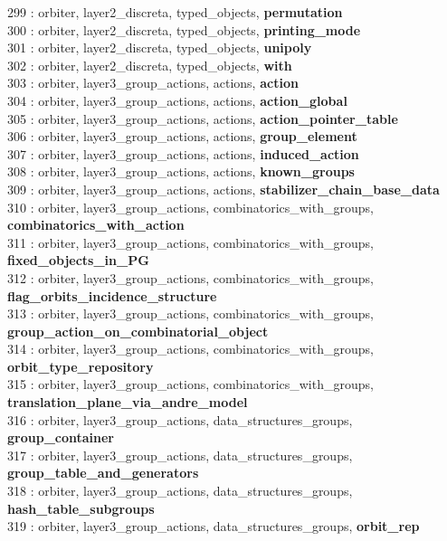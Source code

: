 299 : orbiter, layer2\_discreta, typed\_objects, {\bf permutation}\\
300 : orbiter, layer2\_discreta, typed\_objects, {\bf printing\_mode}\\
301 : orbiter, layer2\_discreta, typed\_objects, {\bf unipoly}\\
302 : orbiter, layer2\_discreta, typed\_objects, {\bf with}\\
303 : orbiter, layer3\_group\_actions, actions, {\bf action}\\
304 : orbiter, layer3\_group\_actions, actions, {\bf action\_global}\\
305 : orbiter, layer3\_group\_actions, actions, {\bf action\_pointer\_table}\\
306 : orbiter, layer3\_group\_actions, actions, {\bf group\_element}\\
307 : orbiter, layer3\_group\_actions, actions, {\bf induced\_action}\\
308 : orbiter, layer3\_group\_actions, actions, {\bf known\_groups}\\
309 : orbiter, layer3\_group\_actions, actions, {\bf stabilizer\_chain\_base\_data}\\
310 : orbiter, layer3\_group\_actions, combinatorics\_with\_groups, {\bf combinatorics\_with\_action}\\
311 : orbiter, layer3\_group\_actions, combinatorics\_with\_groups, {\bf fixed\_objects\_in\_PG}\\
312 : orbiter, layer3\_group\_actions, combinatorics\_with\_groups, {\bf flag\_orbits\_incidence\_structure}\\
313 : orbiter, layer3\_group\_actions, combinatorics\_with\_groups, {\bf group\_action\_on\_combinatorial\_object}\\
314 : orbiter, layer3\_group\_actions, combinatorics\_with\_groups, {\bf orbit\_type\_repository}\\
315 : orbiter, layer3\_group\_actions, combinatorics\_with\_groups, {\bf translation\_plane\_via\_andre\_model}\\
316 : orbiter, layer3\_group\_actions, data\_structures\_groups, {\bf group\_container}\\
317 : orbiter, layer3\_group\_actions, data\_structures\_groups, {\bf group\_table\_and\_generators}\\
318 : orbiter, layer3\_group\_actions, data\_structures\_groups, {\bf hash\_table\_subgroups}\\
319 : orbiter, layer3\_group\_actions, data\_structures\_groups, {\bf orbit\_rep}\\
